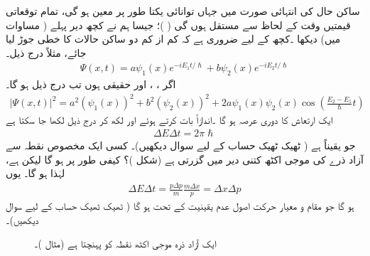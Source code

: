  ساکن حال کی انتہائی صورت میں جہاں توانائی یکتا طور پر معین ہو گی، تمام توقعاتی قیمتیں وقت کے لحاظ سے مستقل ہوں گی ( )؛ جیسا ہم نے کچھ دیر پہلے ( مساوات  میں) دیکھا ۔کچھ  کے لیے ضروری ہے کہ کم از کم دو ساکن حالات کا خطی جوڑ لیا جائے، مثلاً درج ذیل۔ 
\begin{align*}
\Psi (x,t) = a\psi_{1}(x)e^{-iE_{1}t/\hslash} + b\psi_{2}(x)e^{-iE_{2}t/\hslash}
\end{align*}
اگر ، ،  اور حقیقی ہوں تب درج ذیل ہو گا۔
\begin{align*}
| \Psi(x,t)|^{2} = a^{2}(\psi_{1}(x))^{2} + b^{2}(\psi_{2}(x))^{2} + 2a\psi_{1}(x)\psi_{2}(x)\cos \left( \frac{E_{2}-E_{1}}{\hslash} t \right)
\end{align*}
ایک ارتعاش کا دوری عرصہ  ہو گا ۔اندازاً بات کرتے ہوئے  اور  لکھ کر درج ذیل لکھا جا سکتا ہے
\begin{align*}
\Delta E \Delta t = 2\pi\hslash
\end{align*}
جو یقیناً  ہے ( ٹھیک ٹھیک حساب کے لیے سوال  دیکھیں)۔
 کسی ایک مخصوص نقطہ سے آزاد ذرے کی موجی اکٹھ کتنی دیر میں گزرتی ہے (شکل )؟ کیفی طور پر  ہو گا لیکن  ہے، لہٰذا  ہو گا۔ یوں 
\begin{align*}
\Delta E \Delta t = \frac{p\Delta p}{m} \frac{m\Delta x}{p} = \Delta x \Delta p
\end{align*}
ہو گا جو مقام و معیار حرکت اصول عدم یقینیت کے تحت  ہو گا ( ٹھیک ٹھیک حساب کے لیے سوال  دیکھیں)۔
\begin{figure}
\centering
{}
\caption{ایک آزاد ذرہ موجی اکٹھ نقطہ  کو پہنچتا ہے (مثال )۔}
\label{شکل_مثال_قواعد_رفتار_دورانیہ}
\end{figure}


